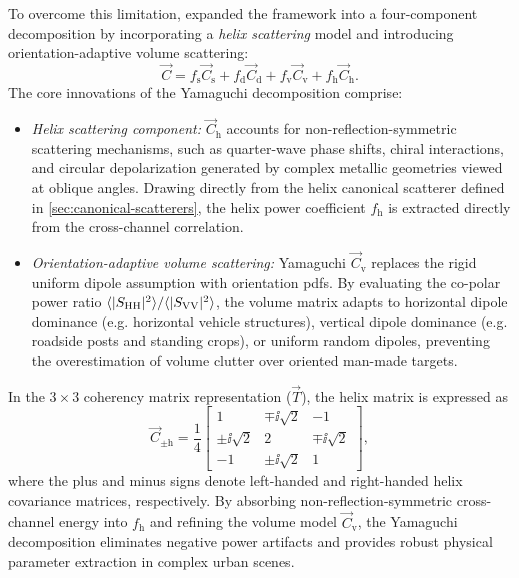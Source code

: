 To overcome this limitation, \textcite{yamaguchiFourcomponentScatteringModel2005} expanded the framework into a four-component decomposition by incorporating a \emph{helix scattering} model and introducing orientation-adaptive volume scattering:
\begin{equation}
    \label{eq:yamaguchi-four-component}
    \vec C = f_{\mathrm{s}} \vec C_{\mathrm{s}} + f_{\mathrm{d}} \vec C_{\mathrm{d}} + f_{\mathrm{v}} \vec C_{\mathrm{v}} + f_{\mathrm{h}} \vec C_{\mathrm{h}}.
\end{equation}
The core innovations of the Yamaguchi decomposition comprise:
\begin{itemize}
    \item \textit{Helix scattering component:} $\vec C_{\mathrm{h}}$ accounts for non-reflection-symmetric scattering mechanisms, such as quarter-wave phase shifts, chiral interactions, and circular depolarization generated by complex metallic geometries viewed at oblique angles.
    Drawing directly from the helix canonical scatterer defined in \cref{sec:canonical-scatterers}, the helix power coefficient $f_{\mathrm{h}}$ is extracted directly from the cross-channel correlation.
    \item \textit{Orientation-adaptive volume scattering:} Yamaguchi $\vec C_{\mathrm{v}}$ replaces the rigid uniform dipole assumption with orientation \glspl{pdf}.
    By evaluating the co-polar power ratio $\langle |S_{\mathrm{HH}}|^2 \rangle / \langle |S_{\mathrm{VV}}|^2 \rangle$, the volume matrix adapts to horizontal dipole dominance (e.g. horizontal vehicle structures), vertical dipole dominance (e.g. roadside posts and standing crops), or uniform random dipoles, preventing the overestimation of volume clutter over oriented man-made targets.
\end{itemize}
In the $3 \times 3$ coherency matrix representation ($\vec T$), the helix matrix is expressed as
\begin{equation}
    \label{eq:helix-matrix}
    \vec C_{\pm\mathrm{h}} = \frac{1}{4} \begin{bmatrix}
        1 & \mp\ii\sqrt{2} & -1 \\
        \pm\ii\sqrt{2} & 2 & \mp\ii\sqrt{2} \\
        -1 & \pm\ii\sqrt{2} & 1
    \end{bmatrix},
\end{equation}
where the plus and minus signs denote left-handed and right-handed helix covariance matrices, respectively.
By absorbing non-reflection-symmetric cross-channel energy into $f_{\mathrm{h}}$ and refining the volume model $\vec C_{\mathrm{v}}$, the Yamaguchi decomposition eliminates negative power artifacts and provides robust physical parameter extraction in complex urban scenes.

